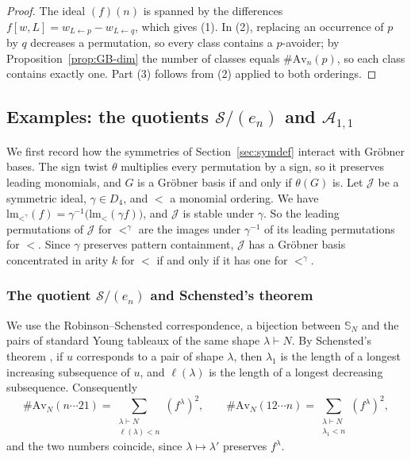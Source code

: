 \documentclass[11pt]{amsart}
\theoremstyle{definition}
\theoremstyle{remark}
\newcommand{\bS}{\mathbb{S}}
\newcommand{\lm}{\mathrm{lm}}
\newcommand{\cA}{\mathscr{A}}
\newcommand{\cJ}{\mathscr{J}}
\newcommand{\cS}{\mathscr{S}}
\newcommand{\Av}{\mathrm{Av}}
\begin{document}
\begin{proof}
The ideal $(f)(n)$ is spanned by the differences $f[w,L]=w_{L\leftarrow p}-w_{L\leftarrow q}$, which gives (1). In (2), replacing an occurrence of $p$ by $q$ decreases a permutation, so every class contains a $p$-avoider; by Proposition~\ref{prop:GB-dim} the number of classes equals $\#\Av_n(p)$, so each class contains exactly one. Part (3) follows from (2) applied to both orderings.
\end{proof}

\subsection{Examples: the quotients \texorpdfstring{$\cS/(e_n)$}{S/(e\_n)} and \texorpdfstring{$\cA_{1,1}$}{A\_(1,1)}}\label{sec:GB-examples}

We first record how the symmetries of Section~\ref{sec:symdef} interact with Gr\"obner bases. The sign twist $\theta$ multiplies every permutation by a sign, so it preserves leading monomials, and $G$ is a Gr\"obner basis if and only if $\theta(G)$ is. Let $\cJ$ be a symmetric ideal, $\gamma\in D_4$, and $<$ a monomial ordering. We have $\lm_{<^\gamma}(f)=\gamma^{-1}\bigl(\lm_<(\gamma f)\bigr)$, and $\cJ$ is stable under $\gamma$. So the leading permutations of $\cJ$ for $<^\gamma$ are the images under $\gamma^{-1}$ of its leading permutations for $<$. Since $\gamma$ preserves pattern containment, $\cJ$ has a Gr\"obner basis concentrated in arity $k$ for $<$ if and only if it has one for $<^\gamma$.

\subsubsection{The quotient $\cS/(e_n)$ and Schensted's theorem}

We use the Robinson--Schensted correspondence, a bijection between $\bS_N$ and the pairs of standard Young tableaux of the same shape $\lambda\vdash N$. By Schensted's theorem \cite{Schensted}, if $u$ corresponds to a pair of shape $\lambda$, then $\lambda_1$ is the length of a longest increasing subsequence of $u$, and $\ell(\lambda)$ is the length of a longest decreasing subsequence. Consequently
\begin{equation}\label{eq:schensted}
\#\Av_N(n\cdots21)=\sum_{\substack{\lambda\vdash N\\ \ell(\lambda)<n}}(f^\lambda)^2,\qquad
\#\Av_N(12\cdots n)=\sum_{\substack{\lambda\vdash N\\ \lambda_1<n}}(f^\lambda)^2,
\end{equation}
and the two numbers coincide, since $\lambda\mapsto\lambda'$ preserves $f^\lambda$.
\end{document}
